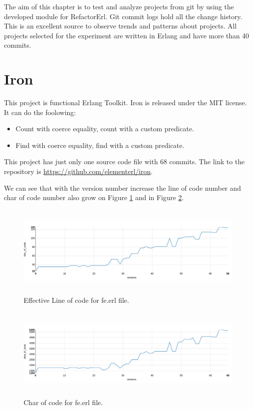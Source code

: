 The aim of this chapter is to test and analyze projects from git by using the developed module for RefactorErl. Git commit logs hold all the change history. This is an excellent source to observe trends and patterns about projects. All projects selected for the experiment are written in Erlang and have more than 40 commits.

\section{Iron}

This project is functional Erlang Toolkit. Iron is released under the MIT license. It can do the foolowing:
\begin{itemize}
	\item Count with coerce equality, count with a custom predicate.
	\item Find with coerce equality, find with a custom predicate.
\end{itemize}

This project has just only one source code file with 68 commits. The link to the repository is \url{https://github.com/elementerl/iron}.

We can see that with the version number increase the line of code number and char of code number also grow on Figure \ref{fig:loc_iron} and in Figure \ref{fig:char_iron}.

\begin{figure}[ht]
	\centering
	\includegraphics[height=45mm]{figures/loc_iron.png}
	\caption{Effective Line of code for fe.erl file.}
	\label{fig:loc_iron}
\end{figure}

\begin{figure}[ht]
	\centering
	\includegraphics[height=45mm]{figures/char_iron.png}
	\caption{Char of code for fe.erl file.}
	\label{fig:char_iron}
\end{figure}

